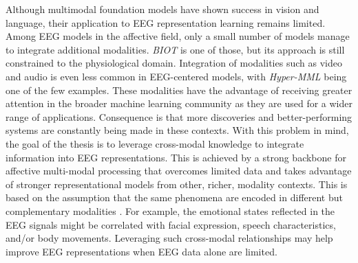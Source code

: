 Although multimodal foundation models have shown success in vision and language, their application to EEG representation learning remains limited.
Among EEG models in the affective field, only a small number of models manage to integrate additional modalities.
\textit{BIOT} \cite{NEURIPS2023_f6b30f3e} is one of those, but its approach is still constrained to the physiological domain.
Integration of modalities such as video and audio is even less common in EEG-centered models, with \textit{Hyper-MML} \cite{kang2025hypergraphmultimodallearningeegbased} being one of the few examples.
These modalities have the advantage of receiving greater attention in the broader machine learning community as they are used for a wider range of applications.
Consequence is that more discoveries and better-performing systems are constantly being made in these contexts.
With this problem in mind, the goal of the thesis is to leverage cross-modal knowledge to integrate information into EEG representations. 
This is achieved by a strong backbone for affective multi-modal processing that overcomes limited data and takes advantage of stronger representational models from other, richer, modality contexts.
This is based on the assumption that the same phenomena are encoded in different but complementary modalities \cite{AHMED2023200171}.
For example, the emotional states reflected in the EEG signals might be correlated with facial expression, speech characteristics, and/or body movements.
Leveraging such cross-modal relationships may help improve EEG representations when EEG data alone are limited.

